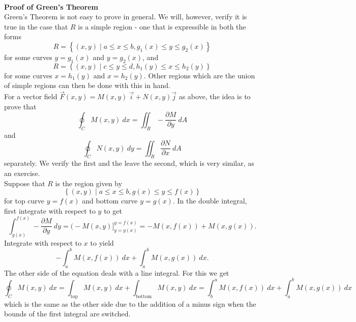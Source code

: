 \\

\noindent\textbf{\large Proof of Green's Theorem}\\

Green's Theorem is not easy to prove in general.  We will, however, verify it is true in the case that $R$ is a simple region - one that is expressible in both the forms
$$R = \left\{ (x,y) \mid a \leq x \leq b, g_1(x) \leq y \leq g_2(x) \right\}$$
for some curves $y = g_1(x)$ and $y = g_2(x)$, and
$$R = \left\{ (x,y) \mid c \leq y \leq d, h_1(y) \leq x \leq h_2(y) \right\}$$
for some curves $x = h_1(y)$ and $x = h_2(y)$. Other regions which are the union of simple regions can then be done with this in hand.\\

For a vector field $\vec F(x,y) = M(x,y) \: \vec i + N(x,y) \vec j$ as above, the idea is to prove that
$$\oint_C M(x,y) \: dx = \iint_R -\dfrac{\partial M}{\partial y} \: dA$$
and
$$\oint_C N(x,y) \: dy = \iint_R \dfrac{\partial N}{\partial x} \: dA$$
separately. We verify the first and the leave the second, which is very similar, as an exercise.\\

Suppose that $R$ is the region given by
$$\left\{ (x,y) \mid a \leq x \leq b, g(x) \leq y \leq f(x) \right\}$$
for top curve $y = f(x)$ and bottom curve $y = g(x)$.  In the double integral, first integrate with respect to $y$ to get
$$\int_{g(x)}^{f(x)} -\dfrac{\partial M}{\partial y} \: dy = \Big( -M(x,y) \Big]_{y=g(x)}^{y=f(x)} = -M(x,f(x)) + M(x,g(x)).$$
Integrate with respect to $x$ to yield
$$-\int_a^b M(x,f(x)) \: dx + \int_a^b M(x,g(x)) \: dx.$$
The other side of the equation deals with a line integral. For this we get
$$\oint_C M(x,y) \: dx = \int_{\text{top}} M(x,y) \: dx + \int_{\text{bottom}} M(x,y) \: dx = \int_b^a M(x,f(x)) \: dx + \int_a^b M(x,g(x)) \: dx$$
which is the same as the other side due to the addition of a minus sign when the bounds of the first integral are switched.\\

